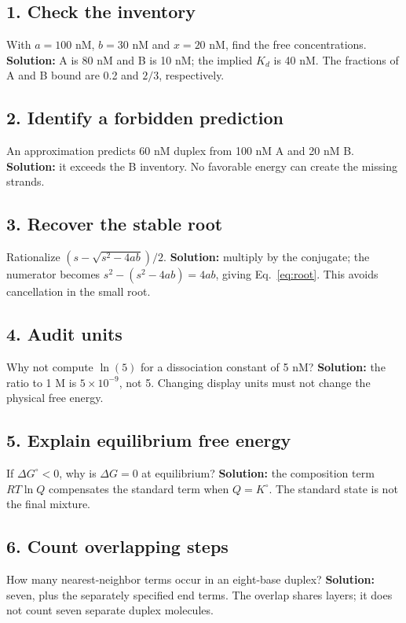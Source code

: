 \subsection*{1. Check the inventory}
With $a=100$ nM, $b=30$ nM and $x=20$ nM, find the free concentrations.
\textbf{Solution:} A is 80 nM and B is 10 nM; the implied $K_d$ is 40 nM.
The fractions of A and B bound are 0.2 and $2/3$, respectively.

\subsection*{2. Identify a forbidden prediction}
An approximation predicts 60 nM duplex from 100 nM A and 20 nM B.
\textbf{Solution:} it exceeds the B inventory. No favorable energy can
create the missing strands.

\subsection*{3. Recover the stable root}
Rationalize $(s-\sqrt{s^2-4ab})/2$.
\textbf{Solution:} multiply by the conjugate; the numerator becomes
$s^2-(s^2-4ab)=4ab$, giving Eq.~\ref{eq:root}. This avoids cancellation
in the small root.

\subsection*{4. Audit units}
Why not compute $\ln(5)$ for a dissociation constant of 5 nM?
\textbf{Solution:} the ratio to 1 M is $5\times10^{-9}$, not 5.
Changing display units must not change the physical free energy.

\subsection*{5. Explain equilibrium free energy}
If $\Delta G^\circ<0$, why is $\Delta G=0$ at equilibrium?
\textbf{Solution:} the composition term $RT\ln Q$ compensates the standard
term when $Q=K^\circ$. The standard state is not the final mixture.

\subsection*{6. Count overlapping steps}
How many nearest-neighbor terms occur in an eight-base duplex?
\textbf{Solution:} seven, plus the separately specified end terms.
The overlap shares layers; it does not count seven separate duplex molecules.

